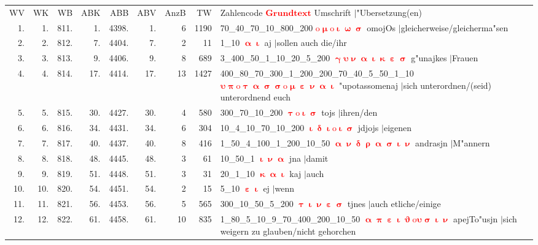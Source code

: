 \documentclass[a4paper,10pt,landscape]{article}
\begin{document}
\begin{tabular}{rrrrrrrrp{120mm}}
WV&WK&WB&ABK&ABB&ABV&AnzB&TW&Zahlencode \textcolor{red}{$\boldsymbol{Grundtext}$} Umschrift $|$"Ubersetzung(en)\\
1.&1.&811.&1.&4398.&1.&6&1190&70\_40\_70\_10\_800\_200 \textcolor{red}{$\boldsymbol{\mathrm{o}\upmu\mathrm{o}\upiota\upomega\upsigma}$} omojOs $|$gleicherweise/gleicherma"sen\\
2.&2.&812.&7.&4404.&7.&2&11&1\_10 \textcolor{red}{$\boldsymbol{\upalpha\upiota}$} aj $|$sollen auch die/ihr\\
3.&3.&813.&9.&4406.&9.&8&689&3\_400\_50\_1\_10\_20\_5\_200 \textcolor{red}{$\boldsymbol{\upgamma\upsilon\upnu\upalpha\upiota\upkappa\upepsilon\upsigma}$} g"unajkes $|$Frauen\\
4.&4.&814.&17.&4414.&17.&13&1427&400\_80\_70\_300\_1\_200\_200\_70\_40\_5\_50\_1\_10 \textcolor{red}{$\boldsymbol{\upsilon\uppi\mathrm{o}\uptau\upalpha\upsigma\upsigma\mathrm{o}\upmu\upepsilon\upnu\upalpha\upiota}$} "upotassomenaj $|$sich unterordnen/(seid) unterordnend euch\\
5.&5.&815.&30.&4427.&30.&4&580&300\_70\_10\_200 \textcolor{red}{$\boldsymbol{\uptau\mathrm{o}\upiota\upsigma}$} tojs $|$ihren/den\\
6.&6.&816.&34.&4431.&34.&6&304&10\_4\_10\_70\_10\_200 \textcolor{red}{$\boldsymbol{\upiota\updelta\upiota\mathrm{o}\upiota\upsigma}$} jdjojs $|$eigenen\\
7.&7.&817.&40.&4437.&40.&8&416&1\_50\_4\_100\_1\_200\_10\_50 \textcolor{red}{$\boldsymbol{\upalpha\upnu\updelta\uprho\upalpha\upsigma\upiota\upnu}$} andrasjn $|$M"annern\\
8.&8.&818.&48.&4445.&48.&3&61&10\_50\_1 \textcolor{red}{$\boldsymbol{\upiota\upnu\upalpha}$} jna $|$damit\\
9.&9.&819.&51.&4448.&51.&3&31&20\_1\_10 \textcolor{red}{$\boldsymbol{\upkappa\upalpha\upiota}$} kaj $|$auch\\
10.&10.&820.&54.&4451.&54.&2&15&5\_10 \textcolor{red}{$\boldsymbol{\upepsilon\upiota}$} ej $|$wenn\\
11.&11.&821.&56.&4453.&56.&5&565&300\_10\_50\_5\_200 \textcolor{red}{$\boldsymbol{\uptau\upiota\upnu\upepsilon\upsigma}$} tjnes $|$auch etliche/einige\\
12.&12.&822.&61.&4458.&61.&10&835&1\_80\_5\_10\_9\_70\_400\_200\_10\_50 \textcolor{red}{$\boldsymbol{\upalpha\uppi\upepsilon\upiota\upvartheta\mathrm{o}\upsilon\upsigma\upiota\upnu}$} apejTo"usjn $|$sich weigern zu glauben/nicht gehorchen\\

\end{tabular}
\end{document}
